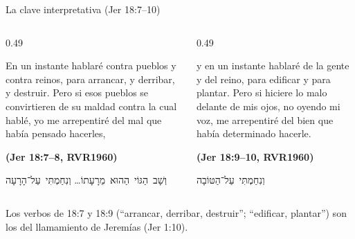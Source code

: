 \documentclass[hyperref={bookmarks=false},aspectratio=169]{beamer}
\newcommand{\heb}[1]{\mbox{\foreignlanguage{hebrew}{#1}}}
\newcommand{\fuente}[1]{\par\hfill{\upshape\bfseries\footnotesize\textcolor{azul}{#1}}}
\begin{document}
\begin{frame}{La clave interpretativa (Jer 18:7--10)}
\begin{columns}[t,onlytextwidth]
\begin{column}{0.49\textwidth}
\begin{cita}En un instante hablaré contra pueblos y contra reinos, para arrancar, y derribar, y destruir. Pero si esos pueblos se convirtieren de su maldad contra la cual hablé, yo me arrepentiré del mal que había pensado hacerles,\fuente{(Jer 18:7--8, RVR1960)}\end{cita}
\begin{center}\heb{וְשָׁב הַגּוֹי הַהוּא מֵרָעָתוֹ}\ldots{} \heb{וְנִחַמְתִּי עַל־הָרָעָה}\end{center}
\end{column}
\begin{column}{0.49\textwidth}
\begin{cita}y en un instante hablaré de la gente y del reino, para edificar y para plantar. Pero si hiciere lo malo delante de mis ojos, no oyendo mi voz, me arrepentiré del bien que había determinado hacerle.\fuente{(Jer 18:9--10, RVR1960)}\end{cita}
\begin{center}\heb{וְנִחַמְתִּי עַל־הַטּוֹבָה}\end{center}
\end{column}
\end{columns}\par\smallskip
\small\RaggedRight Los verbos de 18:7 y 18:9 (``arrancar, derribar, destruir''; ``edificar, plantar'') son los del llamamiento de Jeremías (Jer 1:10).
\end{frame}
\end{document}
